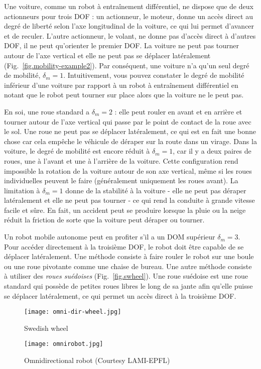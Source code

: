Une voiture, comme un robot à entraînement différentiel, ne dispose que de deux actionneurs pour trois DOF : un actionneur, le moteur, donne un accès direct au degré de liberté selon l'axe longitudinal de la voiture, ce qui lui permet d'avancer et de reculer. L'autre actionneur, le volant, ne donne pas d'accès direct à d'autres DOF, il ne peut qu'orienter le premier DOF. La voiture ne peut pas tourner autour de l'axe vertical et elle ne peut pas se déplacer latéralement (Fig.~\ref{fig.mobility-example2}). Par conséquent, une voiture n'a qu'un seul degré de mobilité, $\delta_m = 1$. Intuitivement, vous pouvez constater le degré de mobilité inférieur d'une voiture par rapport à un robot à entraînement différentiel en notant que le robot peut tourner sur place alors que la voiture ne le peut pas.

En soi, une roue standard a $\delta_m=2$ : elle peut rouler en avant et en arrière et tourner autour de l'axe vertical qui passe par le point de contact de la roue avec le sol. Une roue ne peut pas se déplacer latéralement, ce qui est en fait une bonne chose car cela empêche le véhicule de déraper sur la route dans un virage. Dans la voiture, le degré de mobilité est encore réduit à $\delta_m=1$, car il y a deux paires de roues, une à l'avant et une à l'arrière de la voiture. Cette configuration rend impossible la rotation de la voiture autour de son axe vertical, même si les roues individuelles peuvent le faire (généralement uniquement les roues avant). La limitation à $\delta_m=1$ donne de la stabilité à la voiture - elle ne peut pas déraper latéralement et elle ne peut pas tourner - ce qui rend la conduite à grande vitesse facile et sûre. En fait, un accident peut se produire lorsque la pluie ou la neige réduit la friction de sorte que la voiture peut déraper ou tourner.

Un robot mobile autonome peut en profiter s'il a un DOM supérieur $\delta_m = 3$. Pour accéder directement à la troisième DOF, le robot doit être capable de se déplacer latéralement. Une méthode consiste à faire rouler le robot sur une boule ou une roue pivotante comme une chaise de bureau. Une autre méthode consiste à utiliser des \emph{roues suédoises} (Fig.~\ref{fig.swheel}). Une roue suédoise est une roue standard qui possède de petites roues libres le long de sa jante afin qu'elle puisse se déplacer latéralement, ce qui permet un accès direct à la troisième DOF.

\begin{figure}
\begin{minipage}{.45\textwidth}
\texttt{[image: omni-dir-wheel.jpg]}
\caption{Swedish wheel}\label{fig.swheel}
\end{minipage}
\hspace{\fill}
\begin{minipage}{.45\textwidth}\texttt{[image: omnirobot.jpg]}
\caption{Omnidirectional robot (Courtesy LAMI-EPFL)}\label{fig.omni-robot}
\end{minipage}
\end{figure}

